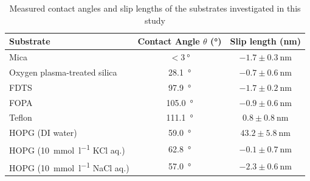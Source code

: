 \documentclass[journal=jacsat,manuscript=article]{achemso}
\begin{document}
\begin{table}[p]
  \caption{Measured contact angles and slip lengths of the substrates investigated in this study}
  \label{tbl:contact_angle_slip}
  \begin{tabular}{lcc}
    \hline
    Substrate & Contact Angle \(\theta\) (\si{\degree}) & Slip length (\si{\nano\metre}) \\
    \hline
    Mica & \(< \SI{3}{\degree}\) & \(-1.7 \pm \SI{0.3}{\nano\metre}\) \\
    Oxygen plasma-treated silica & \SI{28.1}{\degree} & \(-0.7 \pm \SI{0.6}{\nano\metre}\) \\
    FDTS & \SI{97.9}{\degree} & \(-1.7 \pm \SI{0.2}{\nano\metre}\) \\
    FOPA & \SI{105.0}{\degree} & \(-0.9 \pm \SI{0.6}{\nano\metre}\) \\
    Teflon & \SI{111.1}{\degree} & \(0.8 \pm \SI{0.8}{\nano\metre}\) \\
    HOPG (DI water) & \SI{59.0}{\degree} & \(43.2 \pm \SI{5.8}{\nano\metre}\) \\
    HOPG (\SI{10}{\milli\mole\per\litre} KCl aq.) & \SI{62.8}{\degree} & \(-0.1 \pm \SI{0.7}{\nano\metre}\) \\
    HOPG (\SI{10}{\milli\mole\per\litre} NaCl aq.) & \SI{57.0}{\degree} & \(-2.3 \pm \SI{0.6}{\nano\metre}\) \\
    \hline
  \end{tabular}
\end{table}

\clearpage

\end{document}
